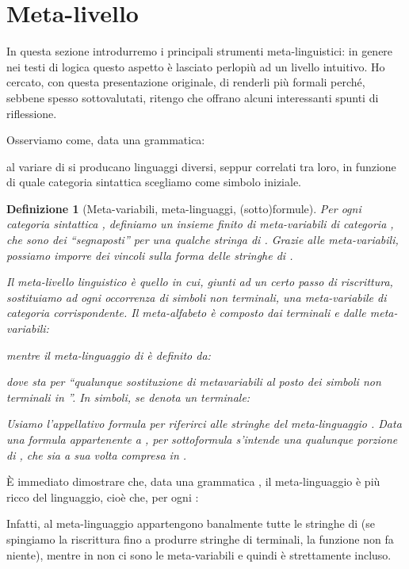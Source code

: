\documentclass[12pt,a4paper,openright,twoside]{report}
\newtheorem{dfn}[thm]{Definizione}
\begin{document}
\section{Meta-livello} 

In questa sezione introdurremo i principali strumenti meta-linguistici: in genere nei testi di logica questo aspetto \`e lasciato perlopi\`u ad un livello intuitivo. Ho cercato, con questa presentazione originale, di renderli pi\`u formali perch\'e, sebbene spesso sottovalutati, ritengo che offrano alcuni interessanti spunti di riflessione.

Osserviamo come, data una grammatica:

al variare di  si producano linguaggi  diversi, seppur correlati tra loro, in funzione di quale categoria sintattica scegliamo come simbolo iniziale.

\begin{dfn}[Meta-variabili, meta-linguaggi, (sotto)formule]
Per ogni categoria sintattica , definiamo un insieme finito  di \emph{meta-variabili} di categoria , che sono dei ``segnaposti'' per una qualche stringa di . Grazie alle meta-variabili, possiamo imporre dei vincoli sulla forma delle stringhe di .

Il \emph{meta-livello linguistico}  \`e quello in cui, giunti ad un certo passo di riscrittura, sostituiamo ad ogni occorrenza di simboli non terminali, una meta-variabile di categoria corrispondente. Il \emph{meta-alfabeto} \`e composto dai terminali e dalle meta-variabili:

mentre il \emph{meta-linguaggio} di  \`e definito da:

dove  sta per ``qualunque sostituzione di metavariabili al posto dei simboli non terminali in ''. In simboli, se  denota un terminale:


Usiamo l'appellativo \emph{formula} per riferirci alle stringhe del meta-linguaggio . Data una formula  appartenente a , per \emph{sottoformula} s'intende una qualunque porzione di , che sia a sua volta compresa in .
\end{dfn}

\`E immediato dimostrare che, data una grammatica , il meta-linguaggio \`e pi\`u ricco del linguaggio, cio\`e che, per ogni :

Infatti, al meta-linguaggio appartengono banalmente tutte le stringhe di  (se spingiamo la riscrittura fino a produrre stringhe di terminali, la funzione  non fa niente), mentre in  non ci sono le meta-variabili e quindi \`e strettamente incluso. 
\end{document}
